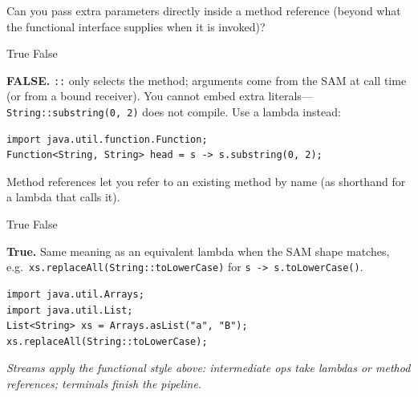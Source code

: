 \question[4]
Can you pass extra parameters directly inside a method reference (beyond what the functional interface supplies when it is invoked)?
\begin{choices}
  \choice True
  \CorrectChoice False
\end{choices}
\begin{solution} 
  \textbf{FALSE.} \texttt{::} only selects the method; arguments come from the SAM at call time (or from a bound receiver). You cannot embed extra literals---\texttt{String::substring(0, 2)} does not compile. Use a lambda instead:

\begin{lstlisting}[style=java]
import java.util.function.Function;
Function<String, String> head = s -> s.substring(0, 2);
\end{lstlisting}
\end{solution}

\question[4]
Method references let you refer to an existing method by name (as shorthand for a lambda that calls it).
\begin{choices}
  \CorrectChoice True
  \choice False
\end{choices}
\begin{solution}
  \textbf{True.} Same meaning as an equivalent lambda when the SAM shape matches, e.g.\ \texttt{xs.replaceAll(String::toLowerCase)} for \texttt{s -> s.toLowerCase()}.

\begin{lstlisting}[style=java]
import java.util.Arrays;
import java.util.List;
List<String> xs = Arrays.asList("a", "B");
xs.replaceAll(String::toLowerCase);
\end{lstlisting}
\end{solution}














\newpage
{}

\noindent\footnotesize\textit{Streams apply the functional style above: intermediate ops take lambdas or method references; terminals finish the pipeline.}\par


